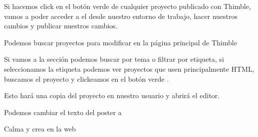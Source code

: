 \documentclass[letterpaper,10pt,spanish]{sphinxmanual}
\begin{document}
Si hacemos click en el botón verde  de cualquier proyecto publicado
con Thimble, vamos a poder acceder a el desde nuestro entorno de trabajo, hacer
nuestros cambios y publicar nuestros cambios.

\begin{figure}[htbp]
\centering

\noindent{}
\end{figure}

Podemos buscar proyectos para modificar en la página principal de Thimble

\begin{figure}[htbp]
\centering

\noindent{}
\end{figure}

Si vamos a la sección  podemos buscar por tema o filtrar por etiqueta, si seleccionamos la etiqueta  podemos ver proyectos
que usen principalmente HTML, buscamos el proyecto  y clickeamos en el botón verde .

\begin{figure}[htbp]
\centering

\noindent{}
\end{figure}

Esto hará una copia del proyecto en nuestro usuario y abrirá el editor.

\begin{figure}[htbp]
\centering

\noindent{}
\end{figure}

Podemos cambiar el texto del poster a

%
\begin{sphinxVerbatim}[commandchars=\\\{\}]
Calma
y
crea en la web
\end{sphinxVerbatim}

\begin{figure}[htbp]
\centering

\noindent{}
\end{figure}
\end{document}
